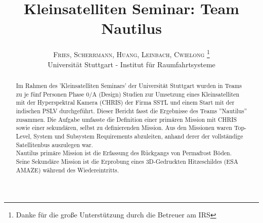 \documentclass[twoside]{article}
\title{\vspace{-15mm}\fontsize{24pt}{10pt}\selectfont\textbf{Kleinsatelliten Seminar: Team Nautilus}} %
\author{
      \textsc{Fries, Scherrmann, Huang, Leinbach, Cwielong} \thanks{Danke für die große Unterstützung durch die Betreuer am IRS}\\[2mm] %
      \normalsize Universität Stuttgart - Institut für Raumfahrtsysteme \\ %
      \vspace{-5mm}
   }
\date{}
\begin{document}
   \maketitle %

   \thispagestyle{fancy} %

   \graphicspath{{images//}}


   \begin{abstract}

      Im Rahmen des 'Kleinsatelliten Seminars' der Universität Stuttgart wurden in
      Teams zu je fünf Personen Phase 0/A (Design) Studien zur Umsetzung eines Kleinsatelliten mit
      der Hyperspektral Kamera (CHRIS) der Firma SSTL und einem Start mit der
      indischen PSLV durchgeführt. Dieser Bericht fasst die Ergebnisse des Teams
      ''Nautilus'' zusammen. Die Aufgabe umfasste die Definition einer primären
      Mission mit CHRIS sowie einer sekundären, selbst zu definierenden Mission. Aus den
      Missionen waren Top-Level, System und Subsystem Requirements abzuleiten, anhand derer
      der vollständige Satellitenbus auszulegen war.\\
      Nautilus primäre Mission ist die Erfassung des Rückgangs von Permafrost Böden.
      Seine Sekundäre Mission ist die Erprobung eines 3D-Gedruckten Hitzeschildes (ESA
      AMAZE) während des Wiedereintritts.


   \end{abstract}



\end{document}
